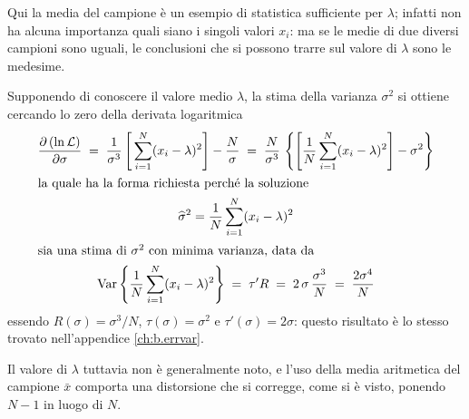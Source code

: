 Qui la media del campione \`e un esempio di statistica
sufficiente per $\lambda$; infatti non ha alcuna importanza
quali siano i singoli valori $x_i$: ma se le medie di due
diversi campioni sono uguali, le conclusioni che si possono
trarre sul valore di $\lambda$ sono le medesime.%

%
Supponendo di conoscere il valore medio $\lambda$, la stima
della varianza $\sigma^2$ si ottiene cercando lo zero della
derivata logaritmica
\begin{gather*}
  \frac{\partial \left( \ln \mathcal{L} \right)}
    {\partial \sigma} \; = \;
    \frac{1}{\sigma^3} \left[ \,
    \sum_{i=1}^N (x_i - \lambda)^2
    \right] - \frac{N}{\sigma} \; = \;
    \frac{N}{\sigma^3} \, \left \{
    \left[ \frac{1}{N}
    \sum_{i=1}^N (x_i - \lambda)^2 \right] -
    \sigma^2 \right \} \\
  \intertext{la quale ha la forma richiesta
    perch\'e la soluzione}
  {\widehat \sigma}^2 = \frac{1}{N}
    \sum_{i=1}^N (x_i - \lambda)^2 \\
  \intertext{sia una stima di $\sigma^2$
    con minima varianza, data da}
  \operatorname{Var} \left \{ \frac{1}{N} \sum_{i=1}^N
    (x_i - \lambda)^2
    \right \} \; = \; \tau' R \; = \;
    2 \, \sigma \, \frac{\sigma^3}{N}
    \; = \; \frac{2 \sigma^4}{N}
\end{gather*}
essendo $R(\sigma)=\sigma^3/N$, $\tau(\sigma)=\sigma^2$ e
$\tau'(\sigma)=2\sigma$: questo risultato \`e lo stesso
trovato nell'appendice \ref{ch:b.errvar}.

Il valore di $\lambda$ tuttavia non \`e generalmente noto, e
l'uso della media aritmetica del campione $\bar x$ comporta
una distorsione che si corregge, come si \`e visto, ponendo
$N-1$ in luogo di $N$.%

\endinput

